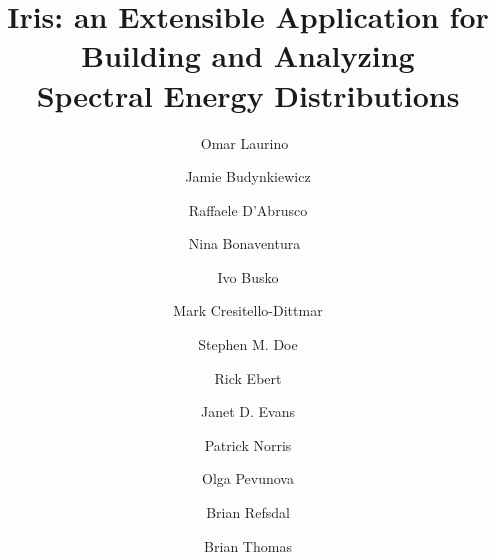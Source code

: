 \documentclass[final,5p,authoryear]{elsarticle}
\begin{document}
\begin{frontmatter}



\title{Iris: an Extensible Application for Building and Analyzing\\
Spectral Energy Distributions}

\author[sao]{Omar Laurino~}

\author[sao]{Jamie Budynkiewicz}

\author[sao]{Raffaele D'Abrusco}

\author[sao]{Nina Bonaventura~}

\author[stsci]{Ivo Busko}

\author[sao]{Mark Cresitello-Dittmar}

\author[sao]{Stephen M. Doe}

\author[ipac]{Rick Ebert}

\author[sao]{Janet D. Evans}

\author[noao]{Patrick Norris}

\author[ipac]{Olga Pevunova}

\author[sao]{Brian Refsdal}

\author[noao]{Brian Thomas}


\end{frontmatter}
\end{document}
